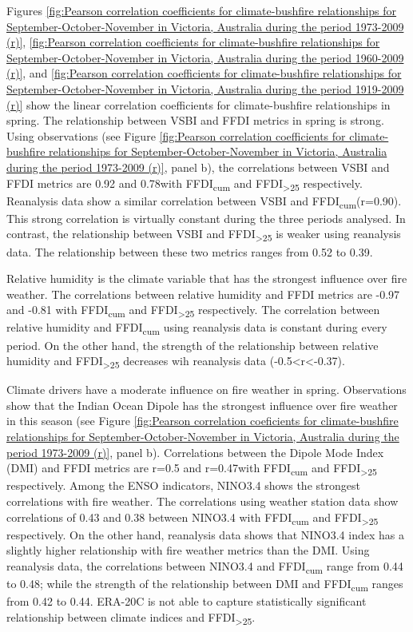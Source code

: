 Figures \ref{fig:Pearson correlation coefficients for climate-bushfire relationships for September-October-November in Victoria, Australia during the period 1973-2009 (r)},
\ref{fig:Pearson correlation coefficients for climate-bushfire relationships for September-October-November in Victoria, Australia during the period 1960-2009 (r)},
and \ref{fig:Pearson correlation coefficients for climate-bushfire relationships for September-October-November in Victoria, Australia during the period 1919-2009 (r)}
show the linear correlation coefficients for climate-bushfire relationships
in spring. The relationship between VSBI and FFDI metrics in spring
is strong. Using observations (see Figure \ref{fig:Pearson correlation coefficients for climate-bushfire relationships for September-October-November in Victoria, Australia during the period 1973-2009 (r)},
panel b), the correlations between VSBI and FFDI metrics are 0.92
and 0.78\textemdash with FFDI\textsubscript{cum} and FFDI\textsubscript{>25}
respectively\textemdash . Reanalysis data show a similar correlation
between VSBI and FFDI\textsubscript{cum}(r=0.90). This strong correlation
is virtually constant during the three periods analysed. In contrast,
the relationship between VSBI and FFDI\textsubscript{>25} is weaker
using reanalysis data. The relationship between these two metrics
ranges from 0.52 to 0.39.

Relative humidity is the climate variable that has the strongest influence
over fire weather. The correlations between relative humidity and
FFDI metrics are -0.97 and -0.81 with FFDI\textsubscript{cum} and
FFDI\textsubscript{>25} respectively\textemdash . The correlation
between relative humidity and FFDI\textsubscript{cum} using reanalysis
data is constant during every period. On the other hand, the strength
of the relationship between relative humidity and FFDI\textsubscript{>25}
decreases wih reanalysis data (-0.5<r<-0.37). 

Climate drivers have a moderate influence on fire weather in spring.
Observations show that the Indian Ocean Dipole has the strongest influence
over fire weather in this season (see Figure \ref{fig:Pearson correlation coeficients for climate-bushfire relationships for September-October-November in Victoria, Australia during the period 1973-2009 (r)},
panel b). Correlations between the Dipole Mode Index (DMI) and FFDI
metrics are r=0.5 and r=0.47\textemdash with FFDI\textsubscript{cum}
and FFDI\textsubscript{>25} respectively\textemdash . Among the ENSO
indicators, NINO3.4 shows the strongest correlations with fire weather\textemdash .
The correlations using weather station data show correlations of 0.43
and 0.38 between NINO3.4 with FFDI\textsubscript{cum} and FFDI\textsubscript{>25}
respectively. On the other hand, reanalysis data shows that NINO3.4
index has a slightly higher relationship with fire weather metrics
than the DMI. Using reanalysis data, the correlations between NINO3.4
and FFDI\textsubscript{cum  }range from 0.44 to 0.48; while the strength
of the relationship between DMI and FFDI\textsubscript{cum }ranges
from 0.42 to 0.44. ERA-20C is not able to capture statistically significant
relationship between climate indices and FFDI\textsubscript{>25}. 

